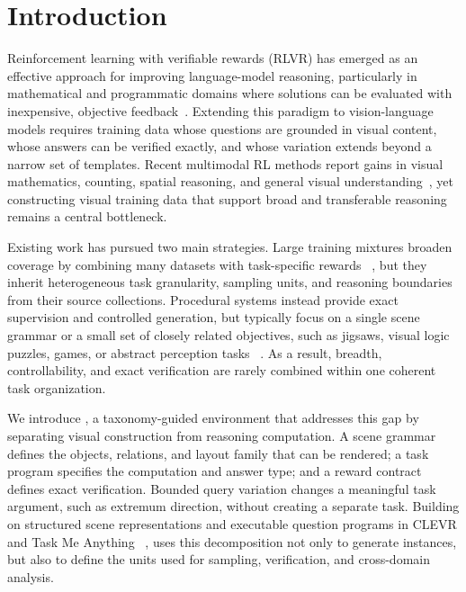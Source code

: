 \section{Introduction}
\label{sec:introduction}

Reinforcement learning with verifiable rewards (RLVR) has emerged as an effective
approach for improving language-model reasoning, particularly in mathematical and
programmatic domains where solutions can be evaluated with inexpensive, objective
feedback~\citep{shao2024deepseekmath,guo2025deepseek}. Extending this paradigm to
vision-language models requires training data whose questions are grounded in
visual content, whose answers can be verified exactly, and whose variation extends
beyond a narrow set of templates. Recent multimodal RL methods report gains in
visual mathematics, counting, spatial reasoning, and general visual
understanding~\citep{liu2025visualrft,huang2025visionr1,peng2025lmmr1,
meng2025mmeureka}, yet constructing visual training data that support broad and
transferable reasoning remains a central bottleneck.

Existing work has pursued two main strategies. Large training mixtures broaden
coverage by combining many datasets with task-specific rewards
~\citep{sarch2026vero}, but they inherit heterogeneous task granularity, sampling
units, and reasoning boundaries from their source collections. Procedural systems
instead provide exact supervision and controlled generation, but typically focus
on a single scene grammar or a small set of closely related objectives, such as
jigsaws, visual logic puzzles, games, or abstract perception tasks
~\citep{wang2025jigsawr1,feng2025visualsphinx,tong2025gamerl,
alam2026sphinx,yang2026tron}. As a result, breadth, controllability, and exact
verification are rarely combined within one coherent task organization.

We introduce \trace, a taxonomy-guided environment that addresses this gap by
separating visual construction from reasoning computation. A scene grammar defines
the objects, relations, and layout family that can be rendered; a task program
specifies the computation and answer type; and a reward contract defines exact
verification. Bounded query variation changes a meaningful task argument, such as
extremum direction, without creating a separate task. Building on structured scene
representations and executable question programs in CLEVR and Task Me Anything
~\citep{johnson2017clevr,zhang2024taskmeanything}, \trace uses this decomposition
not only to generate instances, but also to define the units used for sampling,
verification, and cross-domain analysis.

